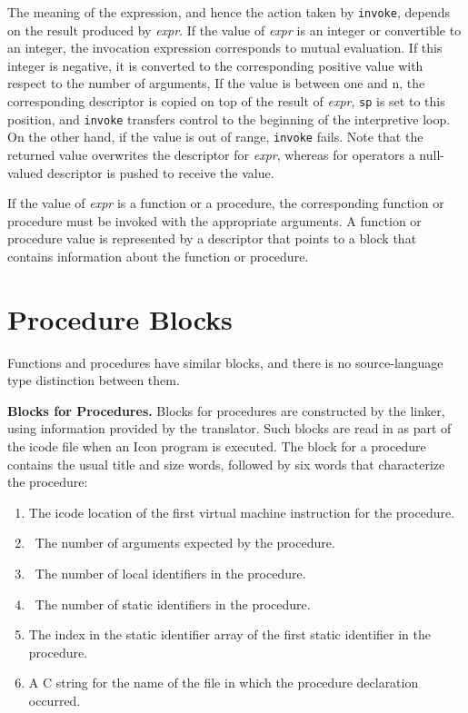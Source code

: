 The meaning of the expression, and hence the action taken by
\texttt{invoke}, depends on the result produced by
\textit{expr}. If the value of
\textit{expr} is an integer or convertible to an
integer, the invocation expression corresponds to mutual
evaluation. If this integer is negative, it is converted to the
corresponding positive value with respect to the number of arguments,
If the value is between one and n, the corresponding descriptor is
copied on top of the result of \textit{expr},
\texttt{sp} is set to this position, and \texttt{invoke} transfers
control to the beginning of the interpretive loop. On the other hand,
if the value is out of range, \texttt{invoke} fails. Note that the
returned value overwrites the descriptor for
\textit{expr}, whereas for operators a null-valued
descriptor is pushed to receive the value.

If the value of \textit{expr} is a function or a
procedure, the corresponding function or procedure must be invoked
with the appropriate arguments. A function or procedure value is
represented by a descriptor that points to a block that contains
information about the function or procedure.

\section{Procedure Blocks}

Functions and procedures have similar blocks, and there is no
source-language type distinction between them.

\textbf{Blocks for Procedures. }Blocks for procedures are constructed
by the linker, using information provided by the translator. Such
blocks are read in as part of the icode file when an Icon program is
executed. The block for a procedure contains the usual title and size
words, followed by six words that characterize the procedure:

\liststyleLxi
\begin{enumerate}
\item 
The icode location of the first virtual machine instruction for the procedure.
\item 
\ The number of arguments expected by the procedure.
\item 
\ The number of local identifiers in the procedure.
\item 
\ The number of static identifiers in the procedure.
\item 
The index in the static identifier array of the first
static identifier in the procedure.
\item 
A C string for the name of the file in which the procedure
declaration occurred.
\end{enumerate}

